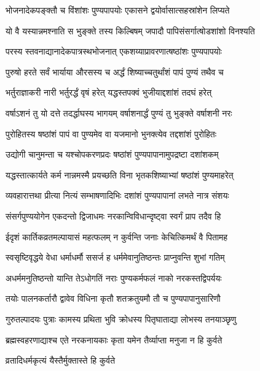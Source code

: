 \twolineshloka
{भोजनादेकपङ्क्तौ च विंशांशः पुण्यपापयोः}
{एकासने द्वयोर्वासात्सहस्रांशेन लिप्यते} %

\twolineshloka
{यो वै यस्यान्नमश्नाति स भुङ्क्ते तस्य किल्बिषम्}
{जपादौ पापिसंसर्गात्षोडशांशो विनश्यति} %

\twolineshloka
{परस्य स्तवनाद्यानादेकपात्रस्थभोजनात्}
{एकशय्याप्रावरणात्षष्ठांशः पुण्यपापयोः} %

\twolineshloka
{पुरुषो हरते सर्वं भार्याया औरसस्य च}
{अर्द्धं शिष्याच्चतुर्थांशं पापं पुण्यं तथैव च} %

\twolineshloka
{भर्तुराज्ञाकरी नारी भर्तुरर्द्धं वृषं हरेत्}
{यद्धस्तपक्वं भुजीयाद्दशांशं तदघं हरेत्} %

\twolineshloka
{वर्षाऽशनं तु यो दत्ते तदर्द्धाघस्य भागयम्}
{वर्षाशनार्द्धं पुण्यं तु भुङ्क्ते वर्षाशनी नरः} %

\twolineshloka
{पुरोहितस्य षष्ठांशं पापं वा पुण्यमेव वा}
{यजमानो भुनक्त्येव तद्दशांशं पुरोहितः} %

\twolineshloka
{उद्योगी चानुमन्ता च यश्चोपकरणप्रदः}
{षष्ठांशं पुण्यपापानामुपद्रष्टा दशांशकम्} %

\twolineshloka
{यद्धस्तात्कार्यते कर्म नान्नमस्मै प्रयच्छति}
{विना भृतकशिष्याभ्यां षष्ठांशं पुण्यमाहरेत्} %

\twolineshloka
{व्यवहारात्तथा प्रीत्या नित्यं सम्भाषणादिभिः}
{दशांशं पुण्यपापानां लभते नात्र संशयः} %

\twolineshloka
{संसर्गपुण्ययोगेन एकदन्तो द्विजाधमः}
{नरकान्विविधान्दृष्ट्वा स्वर्गं प्राप तदैव हि} %


\twolineshloka
{ईदृशं कार्तिकव्रतमल्पायासं महत्फलम्}
{न कुर्वन्ति जनाः केचित्किमर्थं वै पितामह} %


\twolineshloka
{स्वसृष्टिवृद्धये वेधा धर्माधर्मौ ससर्ज ह}
{धर्ममेवानुतिष्ठन्तः प्राप्नुवन्ति शुभां गतिम्} %

\twolineshloka
{अधर्ममनुतिष्ठन्तो यान्ति तेऽधोगतिं नराः}
{पुण्यकर्मफलं नाको नरकस्तद्विपर्ययः} %

\twolineshloka
{तयोः पालनकर्तारौ द्वावेव विधिना कृतौ}
{शतक्रतुयमौ तौ च पुण्यपापानुसारिणौ} %

\twolineshloka
{गुरुतल्पादयः पुत्राः कामस्य प्रथिता भुवि}
{क्रोधस्य पितृघाताद्या लोभस्य तनयाञ्छृणु} %

\twolineshloka
{ब्रह्मस्वहरणाद्याश्च एते नरकनायकाः}
{कृता यमेन तैर्व्याप्ता मनुजा न हि कुर्वते} %


\onelineshloka
{व्रतादिधर्मकृत्यं यैस्तैर्मुक्तास्ते हि कुर्वते} %

